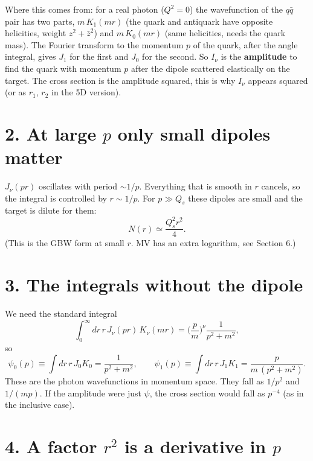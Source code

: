 \documentclass[12pt]{article}
\begin{document}
Where this comes from: for a real photon ($Q^2=0$) the wavefunction of the $q\bar q$ pair has two
parts, $m\,K_1(mr)$ (the quark and antiquark have opposite helicities, weight $z^2+\bar z^2$) and
$m\,K_0(mr)$ (same helicities, needs the quark mass). The Fourier transform to the momentum $p$ of the
quark, after the angle integral, gives $J_1$ for the first and $J_0$ for the second. So $I_\nu$ is the
\textbf{amplitude} to find the quark with momentum $p$ after the dipole scattered elastically on the
target. The cross section is the amplitude squared, this is why $I_\nu$ appears squared (or as
$r_1$, $r_2$ in the 5D version).

\section*{2. At large $p$ only small dipoles matter}

$J_\nu(pr)$ oscillates with period $\sim 1/p$. Everything that is smooth in $r$ cancels, so the
integral is controlled by $r\sim 1/p$. For $p\gg Q_s$ these dipoles are small and the target is
dilute for them:
\begin{equation}
  N(r) \simeq \frac{Q_s^2 r^2}{4}.
  \label{eq:dilute}
\end{equation}
(This is the GBW form at small $r$. MV has an extra logarithm, see Section 6.)

\section*{3. The integrals without the dipole}

We need the standard integral
\begin{equation}
  \int_0^\infty dr\, r\, J_\nu(pr)\,K_\nu(mr) = \Big(\frac{p}{m}\Big)^{\nu}\frac{1}{p^2+m^2},
\end{equation}
so
\begin{equation}
  \psi_0(p)\equiv\int dr\, r\, J_0 K_0 = \frac{1}{p^2+m^2},\qquad
  \psi_1(p)\equiv\int dr\, r\, J_1 K_1 = \frac{p}{m\,(p^2+m^2)} .
\end{equation}
These are the photon wavefunctions in momentum space. They fall as $1/p^2$ and $1/(mp)$. If the
amplitude were just $\psi$, the cross section would fall as $p^{-4}$ (as in the inclusive case).

\section*{4. A factor $r^2$ is a derivative in $p$}
\end{document}
